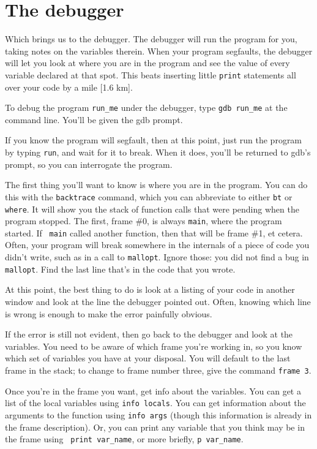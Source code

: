 \documentclass[12pt]{article}
\begin{document}
\section{The debugger}  
Which brings us to the debugger. The debugger will run the program for
you, taking notes on the variables therein. When your program segfaults,
the debugger will let you look at where you
are in the program and see the value of every variable declared at that
spot. This beats inserting little {\tt print} statements all over your
code by a mile [1.6 km].

To debug the program {\tt run\_me} under the debugger, type {\tt gdb
run\_me} at the command line.  You'll be given the gdb prompt.

If you know the program will segfault, then at this point, just run the program
by typing {\tt run}, and wait for it to break. When it does, you'll be
returned to gdb's prompt, so you can interrogate the program.

The first thing you'll want to know is where you are in the program. You
can do this with the {\tt backtrace} command, which you can abbreviate to
either {\tt bt} or {\tt where}. It will show you the stack of function
calls that were pending when the program stopped.  The first, frame
\#0, is always {\tt main}, where the program started. If {\tt
main} called another function, then that will be frame \#1, et cetera.
Often, your program will break somewhere in the internals of a piece of
code you didn't write, such as in a call to {\tt mallopt}. Ignore those:
you did not find a bug in {\tt mallopt}. Find the last line that's in
the code that you wrote.

At this point, the best thing to do is look at a listing of your code
in another window and look at the line the debugger pointed out. Often,
knowing which line is wrong is enough to make the error painfully obvious.

If the error is still not evident, then go back to the debugger and look
at the variables. You need to be aware of which frame you're working in,
so you know which set of variables you have at your disposal.  You
will default to the last frame in the stack; to change to frame number
three, give the command {\tt frame 3}.

Once you're in the frame you want, get info about the variables. You can
get a list of the local variables using {\tt info locals}. You can get
information about the arguments to the function using {\tt info args}
(though this information is already in the frame description). Or, you
can print any variable that you think may be in the frame using {\tt
print var\_name}, or more briefly, {\tt p var\_name}. 
\end{document}

